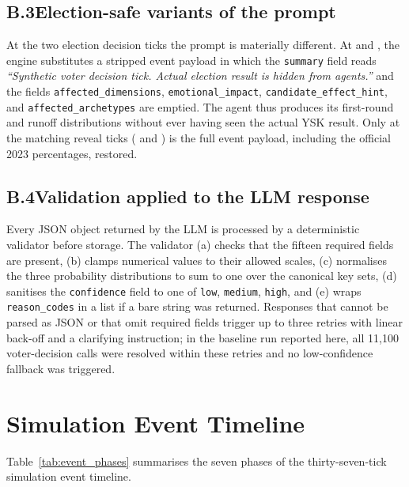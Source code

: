 \documentclass[12pt,a4paper]{report}
\begin{document}
\section*{B.3\quad Election-safe variants of the prompt}

At the two election decision ticks the prompt is materially different. At  and , the engine substitutes a stripped event payload in which the \texttt{summary} field reads \emph{``Synthetic voter decision tick. Actual election result is hidden from agents.''} and the fields \texttt{affected\_dimensions}, \texttt{emotional\_impact}, \texttt{candidate\_effect\_hint}, and \texttt{affected\_archetypes} are emptied. The agent thus produces its first-round and runoff distributions without ever having seen the actual YSK result. Only at the matching reveal ticks ( and ) is the full event payload, including the official 2023 percentages, restored.

\section*{B.4\quad Validation applied to the LLM response}

Every JSON object returned by the LLM is processed by a deterministic validator before storage. The validator (a) checks that the fifteen required fields are present, (b) clamps numerical values to their allowed scales, (c) normalises the three probability distributions to sum to one over the canonical key sets, (d) sanitises the \texttt{confidence} field to one of \texttt{low}, \texttt{medium}, \texttt{high}, and (e) wraps \texttt{reason\_codes} in a list if a bare string was returned. Responses that cannot be parsed as JSON or that omit required fields trigger up to three retries with linear back-off and a clarifying instruction; in the baseline run reported here, all 11{,}100 voter-decision calls were resolved within these retries and no low-confidence fallback was triggered.

\chapter{Simulation Event Timeline}
\label{app:event_timeline}

Table~\ref{tab:event_phases} summarises the seven phases of the thirty-seven-tick simulation event timeline.
\end{document}
